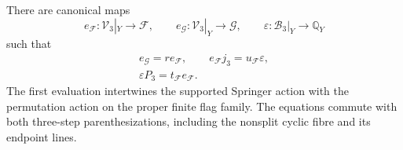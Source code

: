 \begin{theorem}
\label{gh:support-family}
There are canonical maps
\[
 e_{\mathcal F}:\mathcal V_3|_Y\longrightarrow\mathcal F,
 \qquad
 e_{\mathcal G}:\mathcal V_3|_Y\longrightarrow\mathcal G,
 \qquad
 \varepsilon:\mathcal B_3|_Y\longrightarrow\mathbb Q_Y
\]
such that
\begin{equation}\label{sh:family-identities}
 \begin{gathered}
 e_{\mathcal G}=r e_{\mathcal F},\qquad
 e_{\mathcal F}j_3=u_{\mathcal F}\varepsilon,\\
 \varepsilon P_3=t_{\mathcal F}e_{\mathcal F}.
 \end{gathered}
\end{equation}
The first evaluation intertwines the supported Springer action
with the permutation action on the proper finite flag family.
The equations commute with both three-step parenthesizations,
including the nonsplit cyclic fibre and its endpoint lines.
\end{theorem}

